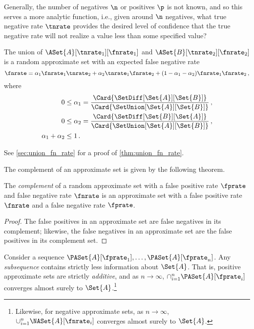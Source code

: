 \documentclass[ ../main.tex]{subfiles}
\begin{document}
Generally, the number of negatives $\n$ or positives $\p$ is not known, and so this serves a more analytic function, i.e., given around $\n$ negatives, what true negative rate $\tnrate$ provides the desired level of confidence that the true negative rate will not realize a value less than some specified value?




\begin{theorem}
	\label{thm:union_fn_rate}
	The union of $\ASet{A}[\tnrate_1][\fnrate_1]$ and $\ASet{B}[\tnrate_2][\fnrate_2]$ is a random approximate set with an expected false negative rate
	\begin{equation}
	\label{eq:union_fn_rate}
	\fnrate =
	\alpha_1 \fnrate_1 \tnrate_2 + \alpha_2 \tnrate_1\fnrate_2\\
	+ (1 - \alpha_1 - \alpha_2) \fnrate_1 \fnrate_2\,,
	\end{equation}
	where
	\begin{equation}
	\begin{split}
	\label{eq:union_fn_rate_alpha}
	0 &\leq \alpha_1 = \frac{\Card{\SetDiff[\Set{A}][\Set{B}]}}{\Card{\SetUnion[\Set{A}][\Set{B}]}}\,,\\
	0 &\leq \alpha_2 = \frac{\Card{\SetDiff[\Set{B}][\Set{A}]}}{\Card{\SetUnion[\Set{A}][\Set{B}]}}\,,\\
	\alpha_1 + \alpha_2 &\leq 1\,.
	\end{split}
	\end{equation}
\end{theorem}
See \cref{sec:union_fn_rate} for a proof of \cref{thm:union_fn_rate}.

The complement of an approximate set is given by the following theorem.
\begin{theorem}
	\label{thm:asetcompl}
	The \emph{complement} of a random approximate set with a false positive rate $\fprate$ and false negative rate $\fnrate$ is an approximate set with a false positive rate $\fnrate$ and a false negative rate $\fprate$.
\end{theorem}
\begin{proof}
	The false positives in an approximate set are false negatives in its complement;
	likewise, the false negatives in an approximate set are the false positives in its complement set.
\end{proof}


\begin{remark}
	Consider a sequence $\PASet{A}[\fprate_1],\ldots,\PASet{A}[\fprate_n]$.
	Any \emph{subsequence} contains strictly less information about $\Set{A}$.
	That is, positive approximate sets are strictly \emph{additive}, and as $n \to \infty$, $\cap_{i=1}^{n} \PASet{A}[\fprate_i]$ converges almost surely to $\Set{A}$.\footnote{Likewise, for negative approximate sets, as $n \to \infty$, $\cup_{i=1}^{n} 
		\NASet{A}[\fnrate_i]$ converges almost surely to $\Set{A}$.}
\end{remark}
\end{document}
